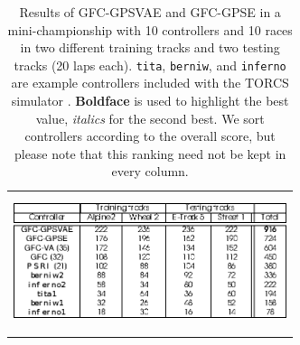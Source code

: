 \documentclass[10pt,journal,compsoc]{IEEEtran}
\begin{document}
\begin{table}[ht]
  \centering
  {\scriptsize
    \caption{\scriptsize Results of {\sf GFC-GPSVAE} and {\sf GFC-GPSE}
      in a mini-championship with 10 controllers
      and 10 races in two different training tracks and two testing tracks (20 laps each). {\tt tita}, {\tt berniw}, and {\tt inferno} are example controllers included with the TORCS
      simulator \cite{torcs4}.  {\bf Boldface} is used to highlight
      the best value, {\em italics} for the second
      best. We sort controllers according to the
        overall score, but please note that this ranking need not be
        kept in every column.}
    {
    							\begin{tabular}{c}
    		\includegraphics[width=8cm, height=4cm, clip=true, trim=0cm 0cm 0cm 0cm]{fig/table4.eps} 
%    		
%
%
%
%
%
\end{tabular}
}\label{tab:allsresults}
}
\end{table}
\end{document}
